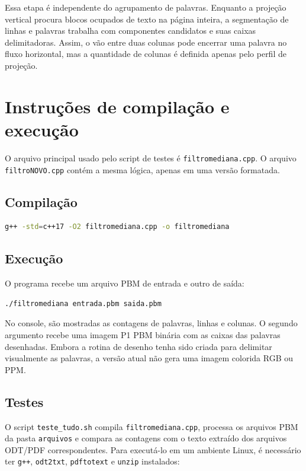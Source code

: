 \documentclass[12pt,a4paper]{article}
\begin{document}
Essa etapa é independente do agrupamento de palavras. Enquanto a projeção vertical procura blocos ocupados de texto na página inteira, a segmentação de linhas e palavras trabalha com componentes candidatos e suas caixas delimitadoras. Assim, o vão entre duas colunas pode encerrar uma palavra no fluxo horizontal, mas a quantidade de colunas é definida apenas pelo perfil de projeção.

\section{Instruções de compilação e execução}

O arquivo principal usado pelo script de testes é \texttt{filtromediana.cpp}. O arquivo \texttt{filtroNOVO.cpp} contém a mesma lógica, apenas em uma versão formatada.

\subsection{Compilação}

\begin{lstlisting}[language=bash]
g++ -std=c++17 -O2 filtromediana.cpp -o filtromediana
\end{lstlisting}

\subsection{Execução}

O programa recebe um arquivo PBM de entrada e outro de saída:

\begin{lstlisting}[language=bash]
./filtromediana entrada.pbm saida.pbm
\end{lstlisting}

No console, são mostradas as contagens de palavras, linhas e colunas. O segundo argumento recebe uma imagem P1 PBM binária com as caixas das palavras desenhadas. Embora a rotina de desenho tenha sido criada para delimitar visualmente as palavras, a versão atual não gera uma imagem colorida RGB ou PPM.

\subsection{Testes}

O script \texttt{teste\_tudo.sh} compila \texttt{filtromediana.cpp}, processa os arquivos PBM da pasta \texttt{arquivos} e compara as contagens com o texto extraído dos arquivos ODT/PDF correspondentes. Para executá-lo em um ambiente Linux, é necessário ter \texttt{g++}, \texttt{odt2txt}, \texttt{pdftotext} e \texttt{unzip} instalados:
\end{document}

